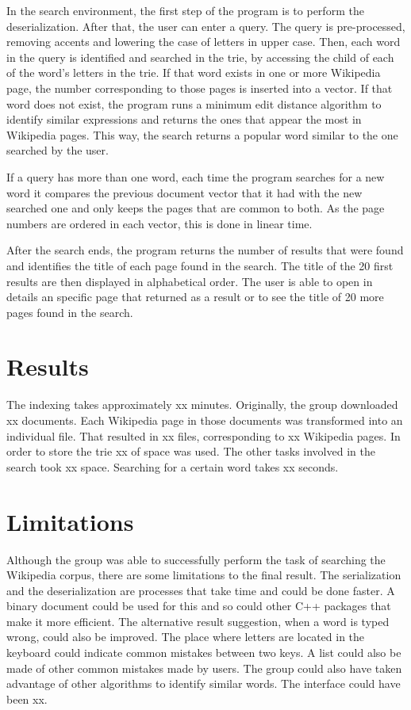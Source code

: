 \documentclass{article}
\begin{document}
In the search environment, the first step of the program is to perform the deserialization. After that, the user can enter a query.  The query is pre-processed, removing accents and lowering the case of letters in upper case. Then, each word in the query is identified and searched in the trie, by accessing the child of each of the word's letters in the trie. If that word exists in one or more Wikipedia page, the number corresponding to those pages is inserted into a vector. If that word does not exist, the program runs a minimum edit distance algorithm to identify similar expressions and returns the ones that appear the most in Wikipedia pages. This way, the search returns a popular word similar to the one searched by the user. 

If a query has more than one word, each time the program searches for a new word it compares the previous document vector that it had with the new searched one and only keeps the pages that are common to both. As the page numbers are ordered in each vector, this is done in linear time. 

After the search ends, the program returns the number of results that were found and identifies the title of each page found in the search. The title of the 20 first results are then displayed in alphabetical order. The user is able to open in details an specific page that returned as a result or to see the title of 20 more pages found in the search. 


\section*{Results}
The indexing takes approximately xx minutes. Originally, the group downloaded xx documents. Each Wikipedia page in those documents was transformed into an individual file. That resulted in xx files, corresponding to xx Wikipedia pages. In order to store the trie xx of space was used. The other tasks involved in the search took xx space. Searching for a certain word takes xx seconds. 

\section*{Limitations}
Although the group was able to successfully perform the task of searching the Wikipedia corpus, there are some limitations to the final result. The serialization and the deserialization are processes that take time and could be done faster. A binary document could be used for this and so could other C++ packages that make it more efficient. The alternative result suggestion, when a word is typed wrong, could also be improved. The place where letters are located in the keyboard could indicate common mistakes between two keys. A list could also be made of other common mistakes made by users. The group could also have taken advantage of other algorithms to identify similar words. The interface could have been xx.  
\end{document}

